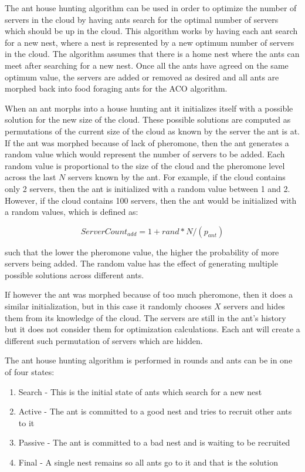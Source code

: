 The ant house hunting algorithm can be used in order to optimize the number of servers in the cloud by having ants search for the optimal number of servers which should be up in the cloud. This algorithm works by having each ant search for a new nest, where a nest is represented by a new optimum number of servers in the cloud. The algorithm assumes that there is a home nest where the ants can meet after searching for a new nest. Once all the ants have agreed on the same optimum value, the servers are added or removed as desired and all ants are morphed back into food foraging ants for the ACO algorithm. \cite{selforg:antreloc}

When an ant morphs into a house hunting ant it initializes itself with a possible solution for the new size of the cloud. These possible solutions are computed as permutations of the current size of the cloud as known by the server the ant is at. If the ant was morphed because of lack of pheromone, then the ant generates a random value which would represent the number of servers to be added. Each random value is proportional to the size of the cloud and the pheromone level across the last $N$ servers known by the ant. For example, if the cloud contains only 2 servers, then the ant is initialized with a random value between 1 and 2. However, if the cloud contains 100 servers, then the ant would be initialized with a random values, which is defined as:

\begin{equation}
ServerCount_{add} = 1 + rand * N / (p_{ant})
\end{equation}

such that the lower the pheromone value, the higher the probability of more servers being added. The random value has the effect of generating multiple possible solutions across different ants.

If however the ant was morphed because of too much pheromone, then it does a similar initialization, but in this case it randomly chooses $X$ servers and hides them from its knowledge of the cloud. The servers are still in the ant's history but it does not consider them for optimization calculations. Each ant will create a different such permutation of servers which are hidden.

The ant house hunting algorithm is performed in rounds and ants can be in one of four states:

\begin{enumerate}
	\item Search - This is the initial state of ants which search for a new nest
	\item Active - The ant is committed to a good nest and tries to recruit other ants to it
	\item Passive - The ant is committed to a bad nest and is waiting to be recruited
	\item Final - A single nest remains so all ants go to it and that is the solution
\end{enumerate}

